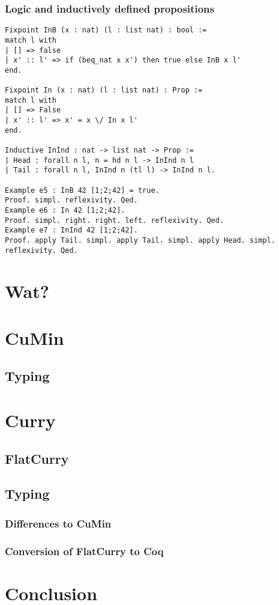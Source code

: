 \documentclass{scrreprt}
\newcommand{\todo}[1]{\marginpar{\textbf{TODO:} #1}}
\begin{document}
\subsection{Logic and inductively defined propositions}
\begin{verbatim}
Fixpoint InB (x : nat) (l : list nat) : bool :=
match l with
| [] => false
| x' :: l' => if (beq_nat x x') then true else InB x l'
end.

Fixpoint In (x : nat) (l : list nat) : Prop :=
match l with
| [] => False
| x' :: l' => x' = x \/ In x l'
end.

Inductive InInd : nat -> list nat -> Prop :=
| Head : forall n l, n = hd n l -> InInd n l
| Tail : forall n l, InInd n (tl l) -> InInd n l.

Example e5 : InB 42 [1;2;42] = true.
Proof. simpl. reflexivity. Qed.
Example e6 : In 42 [1;2;42].
Proof. simpl. right. right. left. reflexivity. Qed.
Example e7 : InInd 42 [1;2;42].
Proof. apply Tail. simpl. apply Tail. simpl. apply Head. simpl. reflexivity. Qed.
\end{verbatim}

\chapter{Wat?}
\chapter{CuMin}
\section{Typing}
\chapter{Curry}
\section{FlatCurry}
\section{Typing}
\subsection{Differences to CuMin}
\subsection{Conversion of FlatCurry to Coq}
\chapter{Conclusion}

\appendix



\end{document}
